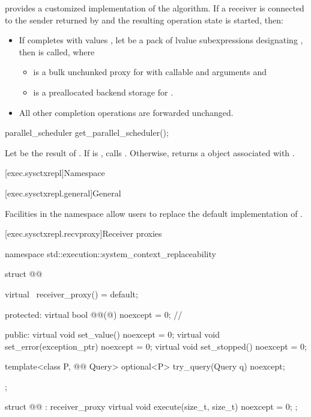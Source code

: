 \pnum
{} provides a customized implementation of
the  algorithm.
If a receiver  is connected to the sender
returned by  and
the resulting operation state is started, then:
\begin{itemize}
\item
If  completes with values ,
let  be a pack of lvalue subexpressions designating ,
then  is called, where
\begin{itemize}
\item
{} is a bulk unchunked proxy for 
with callable  and arguments  and
\item
{} is a preallocated backend storage for .
\end{itemize}
\item
All other completion operations are forwarded unchanged.
\end{itemize}

%
\begin{itemdecl}
parallel_scheduler get_parallel_scheduler();
\end{itemdecl}

\begin{itemdescr}
\pnum
\effects
Let  be the result of .
If  is ,
calls .
Otherwise, returns a  object
associated with .
\end{itemdescr}

[exec.sysctxrepl]{Namespace }

[exec.sysctxrepl.general]{General}

\pnum
Facilities in the  namespace
allow users to replace the default implementation of .

[exec.sysctxrepl.recvproxy]{Receiver proxies}

\begin{codeblock}
namespace std::execution::system_context_replaceability {
  struct @@ {
    virtual ~receiver_proxy() = default;

  protected:
    virtual bool @@(@\unspecnc@) noexcept = 0;   // \expos

  public:
    virtual void set_value() noexcept = 0;
    virtual void set_error(exception_ptr) noexcept = 0;
    virtual void set_stopped() noexcept = 0;

    template<class P, @@ Query>
      optional<P> try_query(Query q) noexcept;
  };

  struct @@ : receiver_proxy {
    virtual void execute(size_t, size_t) noexcept = 0;
  };
}
\end{codeblock}


